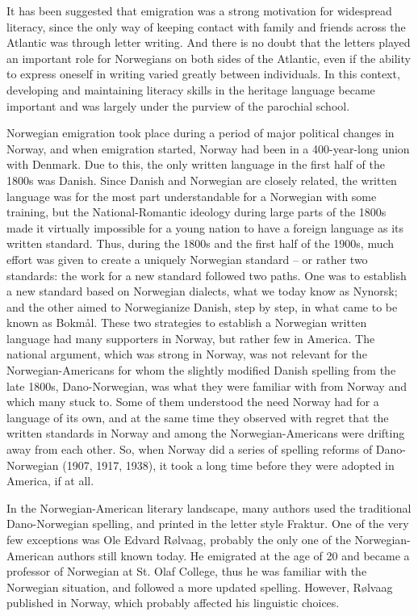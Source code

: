 \documentclass[output=paper]{langscibook}
\begin{document}
It has been suggested that emigration was a strong motivation for widespread literacy, since the only way of keeping contact with family and friends across the Atlantic was through letter writing. And there is no doubt that the letters played an important role for Norwegians on both sides of the Atlantic, even if the ability to express oneself in writing varied greatly between individuals. In this context, developing and maintaining literacy skills in the heritage language became important and was largely under the purview of the parochial school. 

Norwegian emigration took place during a period of major political changes in Norway, and when emigration started, Norway had been in a 400-year-long union with Denmark. Due to this, the only written language in the first half of the 1800s was Danish. Since Danish and Norwegian are closely related, the written language was for the most part understandable for a Norwegian with some training, but the National-Romantic ideology during large parts of the 1800s made it virtually impossible for a young nation to have a foreign language as its written standard. Thus, during the 1800s and the first half of the 1900s, much effort was given to create a uniquely Norwegian standard – or rather two standards: the work for a new standard followed two paths. One was to establish a new standard based on Norwegian dialects, what we today know as Nynorsk; and the other aimed to Norwegianize Danish, step by step, in what came to be known as Bokmål. These two strategies to establish a Norwegian written language had many supporters in Norway, but rather few in America. The national argument, which was strong in Norway, was not relevant for the Norwegian\hyp Americans for whom the slightly modified Danish spelling from the late 1800s, Dano-Norwegian, was what they were familiar with from Norway and which many stuck to. Some of them understood the need Norway had for a language of its own, and at the same time they observed with regret that the written standards in Norway and among the Norwegian\hyp Americans were drifting away from each other. So, when Norway did a series of spelling reforms of Dano\hyp Norwegian (1907, 1917, 1938), it took a long time before they were adopted in America, if at all. 

In the Norwegian\hyp American literary landscape, many authors used the traditional Dano\hyp Norwegian spelling, and printed in the letter style Fraktur. One of the very few exceptions was Ole Edvard Rølvaag, probably the only one of the Norwegian\hyp American authors still known today. He emigrated at the age of 20 and became a professor of Norwegian at St. Olaf College, thus he was familiar with the Norwegian situation, and followed a more updated spelling. However, Rølvaag published in Norway, which probably affected his linguistic choices.
\end{document}
